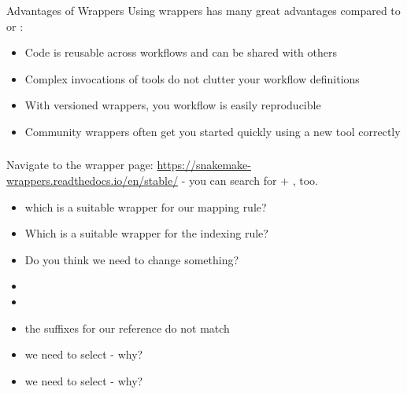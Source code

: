  \begin{frame}{Advantages of Wrappers}
     Using wrappers has many great advantages compared to  or :
     \begin{itemize}[<+->]
         \item Code is reusable across workflows and can be shared with others
         \item Complex invocations of tools do not clutter your \Snakemake{} workflow definitions
         \item With versioned wrappers, you workflow is easily reproducible
         \item Community wrappers often get you started quickly using a new tool correctly
     \end{itemize}
 \end{frame}

\setcounter{preframe_handson}{\value{handson}}
\begin{frame}
	\frametitle{}
	\setcounter{handson}{\value{preframe_handson}}
    Navigate to the wrapper page: \url{https://snakemake-wrappers.readthedocs.io/en/stable/} - you can search for  + , too.\newline
    \vspace{-0.5em}
    \begin{question}
    	\begin{itemize}[<+->]
    		\item which is a suitable wrapper for our mapping rule?
    		\item Which is a suitable wrapper for the indexing rule?
    		\item Do you think we need to change something?
    	\end{itemize}
    \end{question}
    \vspace{-0.5em}
    \pause\footnotesize
    \begin{docs}[Solution]
    	\begin{itemize}[<+->]
    		\item {}
    		\item {}
    		\item the suffixes for our reference do not match
    		\item we need to select  - why?
    		\item we need to select  - why?
    	\end{itemize}
    \end{docs}
\end{frame}


